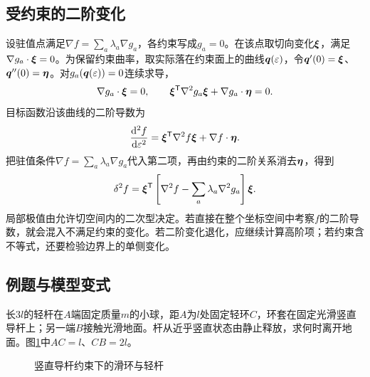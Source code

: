 \subsection{受约束的二阶变化}
\label{sec:complete2}
设驻值点满足$\nabla f=\sum_a\lambda_a\nabla g_a$，各约束写成$g_a=0$。在该点取切向变化$\bm{\xi}$，满足$\nabla g_a\cdot\bm{\xi}=0$。为保留约束曲率，取实际落在约束面上的曲线$\bm{q}(\varepsilon)$，令$\bm{q}'(0)=\bm{\xi}$、$\bm{q}''(0)=\bm{\eta}$。对$g_a(\bm{q}(\varepsilon))=0$连续求导，
\[\nabla g_a\cdot\bm{\xi}=0,\qquad
\bm{\xi}^{\mathsf T}\nabla^2g_a\bm{\xi}+\nabla g_a\cdot\bm{\eta}=0.
\]
目标函数沿该曲线的二阶导数为
\[\frac{\mathop{}\!\mathrm d^2f}{\mathop{}\!\mathrm d\varepsilon^2}
=\bm{\xi}^{\mathsf T}\nabla^2f\bm{\xi}+\nabla f\cdot\bm{\eta}.
\]
把驻值条件$\nabla f=\sum_a\lambda_a\nabla g_a$代入第二项，再由约束的二阶关系消去$\bm{\eta}$，得到
\[
 \delta^2 f=\bm{\xi}^{\mathsf T}
 \left[\nabla^2 f-\sum_a\lambda_a\nabla^2g_a\right]\bm{\xi}.
\]
局部极值由允许切空间内的二次型决定。若直接在整个坐标空间中考察$f$的二阶导数，就会混入不满足约束的变化。若二阶变化退化，应继续计算高阶项；若约束含不等式，还要检验边界上的单侧变化。


\subsection{例题与模型变式}

\begin{example}[竖直导杆上的滑环]\label{ex:hw2-5}

长$3l$的轻杆在$A$端固定质量$m$的小球，距$A$为$l$处固定轻环$C$，环套在固定光滑竖直导杆上；另一端$B$接触光滑地面。杆从近乎竖直状态由静止释放，求何时离开地面。图\ref{fig:hw2-5-q}中$AC=l$、$CB=2l$。

\end{example}


\begin{figure}[H]\centering
{}
\caption{竖直导杆约束下的滑环与轻杆}\label{fig:hw2-5-q}
\end{figure}

